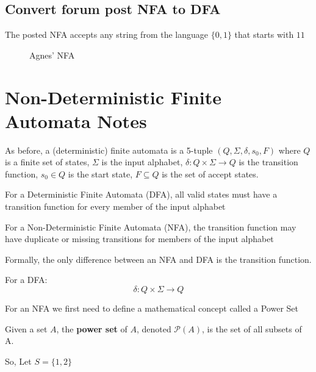 \documentclass[11pt]{article}
\begin{document}
\subsection{Convert forum post NFA to DFA}
The posted NFA accepts any string from the language $\{0, 1\}$ that starts with
$11$


\begin{figure}[H]
	\centering
	\caption{Agnes' NFA}
	\label{fig:agnesnfa}
\end{figure}

\newpage
\section{Non-Deterministic Finite Automata Notes}
As before, a (deterministic) finite automata is a 5-tuple $ (Q, \Sigma, \delta,
s_0, F) $ where $Q$ is a finite set of states, $\Sigma$ is the input alphabet,
$\delta : Q \times \Sigma \to Q$ is the transition function, $s_0 \in Q$ is the
start state, $F \subseteq Q$ is the set of accept states.

For a Deterministic Finite Automata (DFA), all valid states must have a
transition function for every member of the input alphabet

For a Non-Deterministic Finite Automata (NFA), the transition function may have
duplicate or missing transitions for members of the input alphabet

Formally, the only difference between an NFA and DFA is the transition function.

For a DFA: $$\delta : Q \times \Sigma \to Q$$

For an NFA we first need to define a mathematical concept called a Power Set

Given a set $A$, the \textbf{power set} of $A$, denoted $\mathcal{P}(A)$, is the
set of all subsets of A.

So, Let $S=\{1,2\}$
\end{document}
